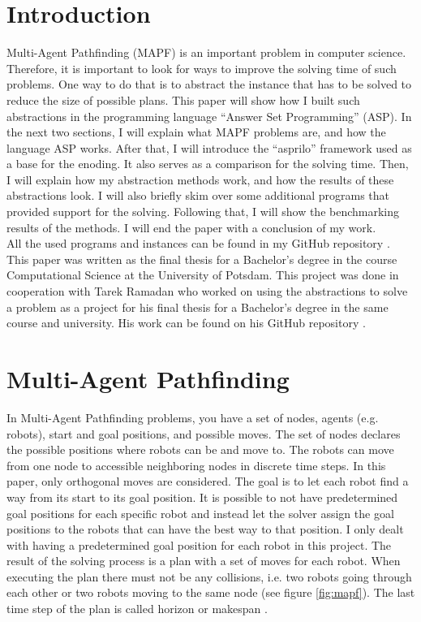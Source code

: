 \documentclass[runningheads]{llncs}
\begin{document}
\section{Introduction}
Multi-Agent Pathfinding (MAPF) is an important problem in computer science. Therefore, it is important to look for ways to improve the solving time of such problems. One way to do that is to abstract the instance that has to be solved to reduce the size of
possible plans. This paper will show how I built such abstractions in the programming language ``Answer Set Programming'' (ASP). In the next two sections, I will explain what MAPF problems are, and how the language ASP works. After that, I will introduce the ``asprilo'' framework used as a base for the enoding. It also serves as a comparison for the solving time. Then, I will explain how my abstraction methods work, and how the results of these abstractions look. I will also briefly skim over some additional programs that provided support for the solving. Following that, I will show the benchmarking results of the methods. I will end the paper with a conclusion of my work. \\
All the used programs and instances can be found in my GitHub repository \cite{my-git}. This paper was written as the final thesis for a Bachelor's degree in the course Computational Science at the University of Potsdam. This project was done in cooperation with Tarek Ramadan who worked on using the abstractions to solve a problem as a project for his final thesis for a Bachelor's degree in the same course and university. His work can be found on his GitHub repository \cite{tarek-git}.

\section{Multi-Agent Pathfinding}
In Multi-Agent Pathfinding problems, you have a set of nodes, agents (e.g. robots), start and goal positions, and possible moves. The set of nodes declares the possible positions where robots can be and move to. The robots can move from one node to accessible neighboring nodes in discrete time steps. In this paper, only orthogonal moves are considered. The goal is to let each robot find a way from its start to its goal position. It is possible to not have predetermined goal positions for each specific robot and instead let the solver assign the goal positions to the robots that can have the best way to that position. I only dealt with having a predetermined goal position for each robot in this project. The result of the solving process is a plan with a set of moves for each robot. When executing the plan there must not be any collisions, i.e. two robots going through each other or two robots moving to the same node (see figure \ref{fig:mapf}). The last time step of the plan is called horizon or makespan \cite{mapf}. 
\end{document}
